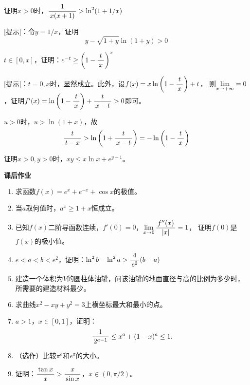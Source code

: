 \egz 证明$x>0$时，$\displaystyle\frac{\,{1}\,}{\,{x(x+1)}\,}>\ln^2(1+1/x)$

[提示]：令$y=1/x$，证明
$$y-\sqrt{1+y}\ln(1+y)>0$$

% 

\egz $t\in[0,x]$，证明：$e^{-t}\geq\left(1-\displaystyle\frac{\,{t}\,}{\,{x}\,}\right)^x$

[提示]：$t=0,x$时，显然成立。此外，设$f(x)=x\ln\left(1-\displaystyle\frac{\,{t}\,}{\,{x}\,}\right)+t$，
则$\lim\limits_{x\to{+\infty}}=0$，证明$f'(x)=\ln\left(1-\displaystyle\frac{\,{t}\,}{\,{x}\,}\right)+\displaystyle\frac{\,{t}\,}{\,{x-t}\,}>0$即可。

$u>0$时，$u>\ln(1+x)$，故
$$\displaystyle\frac{\,{t}\,}{\,{t-x}\,}>\ln\left(1+\displaystyle\frac{\,{t}\,}{\,{x-t}\,}\right)=-\ln\left(1-\displaystyle\frac{\,{t}\,}{\,{x}\,}\right)$$

% 

\egz 证明$x>0,y>0$时，$xy\leq x\ln x+e^{y-1}$。

\begin{ext}
	{\bf 课后作业}
	
	\begin{enumerate}
	  \item 求函数$f(x)=e^x+e^{-x}+\cos x$的极值。
	  \item 当$a$取何值时，$a^x\geq1+x$恒成立。
	  \item 已知$f(x)$二阶导函数连续，$f'(0)=0$，$\lim\limits_{x\to{0}}\displaystyle\frac{\,{f''(x)}\,}{\,{|x|}\,}=1$，
	  证明$f(0)$是$f(x)$的极小值。
	  \item $e<a<b<e^2$，证明：$\ln^2b-\ln^2a>\displaystyle\frac{\,{4}\,}{\,{e^2}\,}(b-a)$
	  \item 建造一个体积为$V$的圆柱体油罐，问该油罐的地面直径与高的比例为多少时，
	  所需要的建造材料最少。
	  \item 求曲线$x^2-xy+y^2=3$上横坐标最大和最小的点。
	  \item $a>1$，$x\in[0,1]$，证明：
	  $$\displaystyle\frac{\,{1}\,}{\,{2^{a-1}}\,}\leq x^a+(1-x)^a\leq 1.$$
	  \item （选作）比较$\pi^e$和$e^{\pi}$的大小。
	  \item 证明：$\displaystyle\frac{\,{\tan x}\,}{\,{x}\,}>\displaystyle\frac{\,{x}\,}{\,{\sin x}\,}$，$x\in(0,\pi/2)$。
	\end{enumerate}
\end{ext}


